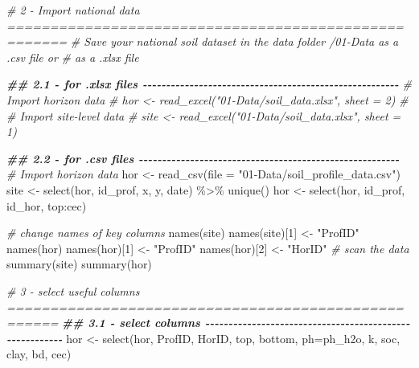 \documentclass[
  10pt,
  b5paper,
  oneside]{book}
\newenvironment{Shaded}{\begin{snugshade}}{\end{snugshade}}
\newcommand{\AttributeTok}[1]{\textcolor[rgb]{0.77,0.63,0.00}{#1}}
\newcommand{\CommentTok}[1]{\textcolor[rgb]{0.56,0.35,0.01}{\textit{#1}}}
\newcommand{\DecValTok}[1]{\textcolor[rgb]{0.00,0.00,0.81}{#1}}
\newcommand{\DocumentationTok}[1]{\textcolor[rgb]{0.56,0.35,0.01}{\textbf{\textit{#1}}}}
\newcommand{\FunctionTok}[1]{\textcolor[rgb]{0.00,0.00,0.00}{#1}}
\newcommand{\NormalTok}[1]{#1}
\newcommand{\OtherTok}[1]{\textcolor[rgb]{0.56,0.35,0.01}{#1}}
\newcommand{\SpecialCharTok}[1]{\textcolor[rgb]{0.00,0.00,0.00}{#1}}
\newcommand{\StringTok}[1]{\textcolor[rgb]{0.31,0.60,0.02}{#1}}
\begin{document}
\begin{Shaded}
\begin{Highlighting}[]
\CommentTok{\# 2 {-} Import national data =====================================================}
\CommentTok{\# Save your national soil dataset in the data folder /01{-}Data as a .csv file or }
\CommentTok{\# as a .xlsx file}

\DocumentationTok{\#\# 2.1 {-} for .xlsx files {-}{-}{-}{-}{-}{-}{-}{-}{-}{-}{-}{-}{-}{-}{-}{-}{-}{-}{-}{-}{-}{-}{-}{-}{-}{-}{-}{-}{-}{-}{-}{-}{-}{-}{-}{-}{-}{-}{-}{-}{-}{-}{-}{-}{-}{-}{-}{-}{-}{-}{-}{-}{-}{-}{-}}
\CommentTok{\# Import horizon data }
\CommentTok{\# hor \textless{}{-} read\_excel("01{-}Data/soil\_data.xlsx", sheet = 2)}
\CommentTok{\# \# Import site{-}level data}
\CommentTok{\# site \textless{}{-} read\_excel("01{-}Data/soil\_data.xlsx", sheet = 1)}

\DocumentationTok{\#\# 2.2 {-} for .csv files {-}{-}{-}{-}{-}{-}{-}{-}{-}{-}{-}{-}{-}{-}{-}{-}{-}{-}{-}{-}{-}{-}{-}{-}{-}{-}{-}{-}{-}{-}{-}{-}{-}{-}{-}{-}{-}{-}{-}{-}{-}{-}{-}{-}{-}{-}{-}{-}{-}{-}{-}{-}{-}{-}{-}{-}}
\CommentTok{\# Import horizon data }
\NormalTok{hor }\OtherTok{\textless{}{-}} \FunctionTok{read\_csv}\NormalTok{(}\AttributeTok{file =} \StringTok{"01{-}Data/soil\_profile\_data.csv"}\NormalTok{)}
\NormalTok{site }\OtherTok{\textless{}{-}} \FunctionTok{select}\NormalTok{(hor, id\_prof, x, y, date) }\SpecialCharTok{\%\textgreater{}\%} \FunctionTok{unique}\NormalTok{()}
\NormalTok{hor }\OtherTok{\textless{}{-}} \FunctionTok{select}\NormalTok{(hor, id\_prof, id\_hor, top}\SpecialCharTok{:}\NormalTok{cec)}

\CommentTok{\# change names of key columns}
\FunctionTok{names}\NormalTok{(site)}
\FunctionTok{names}\NormalTok{(site)[}\DecValTok{1}\NormalTok{] }\OtherTok{\textless{}{-}} \StringTok{"ProfID"}
\FunctionTok{names}\NormalTok{(hor)}
\FunctionTok{names}\NormalTok{(hor)[}\DecValTok{1}\NormalTok{] }\OtherTok{\textless{}{-}} \StringTok{"ProfID"}
\FunctionTok{names}\NormalTok{(hor)[}\DecValTok{2}\NormalTok{] }\OtherTok{\textless{}{-}} \StringTok{"HorID"}
\CommentTok{\# scan the data}
\FunctionTok{summary}\NormalTok{(site)}
\FunctionTok{summary}\NormalTok{(hor)}

\CommentTok{\# 3 {-} select useful columns ====================================================}
\DocumentationTok{\#\# 3.1 {-} select columns {-}{-}{-}{-}{-}{-}{-}{-}{-}{-}{-}{-}{-}{-}{-}{-}{-}{-}{-}{-}{-}{-}{-}{-}{-}{-}{-}{-}{-}{-}{-}{-}{-}{-}{-}{-}{-}{-}{-}{-}{-}{-}{-}{-}{-}{-}{-}{-}{-}{-}{-}{-}{-}{-}{-}{-}}
\NormalTok{hor }\OtherTok{\textless{}{-}} \FunctionTok{select}\NormalTok{(hor, ProfID, HorID, top, bottom, }\AttributeTok{ph=}\NormalTok{ph\_h2o, k, soc, clay, bd, cec)}


\end{Highlighting}
\end{Shaded}
\end{document}
